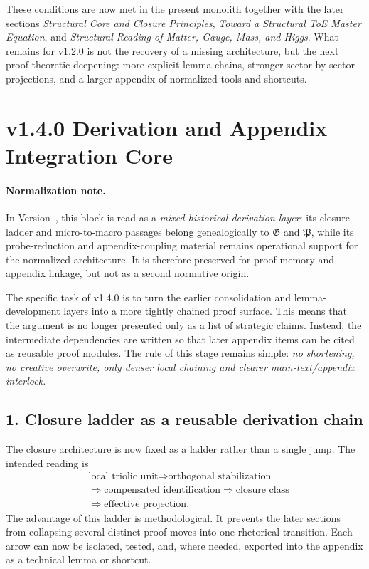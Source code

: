 These conditions are now met in the present monolith together with the later
sections \emph{Structural Core and Closure Principles}, \emph{Toward a
Structural ToE Master Equation}, and \emph{Structural Reading of Matter,
Gauge, Mass, and Higgs}. What remains for v1.2.0 is not the recovery of a
missing architecture, but the next proof-theoretic deepening: more explicit
lemma chains, stronger sector-by-sector projections, and a larger appendix of
normalized tools and shortcuts.

\section*{v1.4.0 Derivation and Appendix Integration Core}

\paragraph{Normalization note.} In Version~\docversion, this block is read as a \emph{mixed historical derivation layer}: its closure-ladder and micro-to-macro passages belong genealogically to $\mathfrak G$ and $\mathfrak P$, while its probe-reduction and appendix-coupling material remains operational support for the normalized architecture. It is therefore preserved for proof-memory and appendix linkage, but not as a second normative origin.


The specific task of v1.4.0 is to turn the earlier consolidation and
lemma-development layers into a more tightly chained proof surface. This means
that the argument is no longer presented only as a list of strategic claims.
Instead, the intermediate dependencies are written so that later appendix items
can be cited as reusable proof modules. The rule of this stage remains simple:
\emph{no shortening, no creative overwrite, only denser local chaining and
clearer main-text/appendix interlock.}

\subsection*{1. Closure ladder as a reusable derivation chain}
The closure architecture is now fixed as a ladder rather than a single jump.
The intended reading is
\[
\begin{aligned}
&\text{local triolic unit} \Longrightarrow \text{orthogonal stabilization}\\
&\Longrightarrow \text{compensated identification} \Longrightarrow \text{closure class}\\
&\Longrightarrow \text{effective projection}.
\end{aligned}
\]
The advantage of this ladder is methodological. It prevents the later sections
from collapsing several distinct proof moves into one rhetorical transition.
Each arrow can now be isolated, tested, and, where needed, exported into the
appendix as a technical lemma or shortcut.

